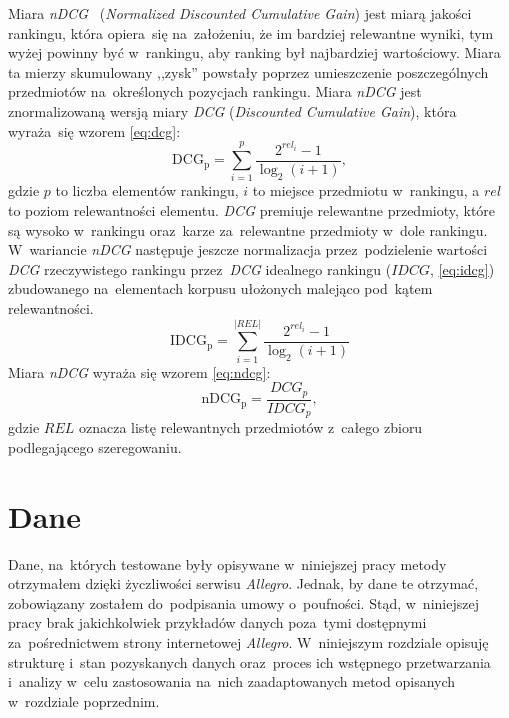\documentclass[pl]{minipw} %
\begin{document}
Miara \textit{nDCG}~\cite{ndcg} (\textit{Normalized Discounted Cumulative Gain}) jest miarą jakości rankingu, która opiera~się na~założeniu, że im bardziej relewantne wyniki, tym wyżej powinny być w~rankingu, aby ranking był najbardziej wartościowy. Miara ta mierzy skumulowany ,,zysk'' powstały poprzez umieszczenie poszczególnych przedmiotów na~określonych pozycjach rankingu. Miara \textit{nDCG} jest znormalizowaną wersją miary \textit{DCG} (\textit{Discounted Cumulative Gain}), która wyraża~się wzorem \ref{eq:dcg}: 
\begin{equation}
\label{eq:dcg}
{\mathrm  {DCG_{{p}}}}=\sum _{{i=1}}^{{p}}{\frac  {2^{{rel_{{i}}}}-1}{\log _{{2}}(i+1)}},
\end{equation}
gdzie $p$ to liczba elementów rankingu, $i$ to miejsce przedmiotu w~rankingu, a $rel$ to poziom relewantności elementu. \textit{DCG} premiuje relewantne przedmioty, które są wysoko w~rankingu oraz~karze za~relewantne przedmioty w~dole rankingu. W~wariancie \textit{nDCG} następuje jeszcze normalizacja przez~podzielenie wartości \textit{DCG} rzeczywistego rankingu przez~\textit{DCG} idealnego rankingu ($IDCG$, \ref{eq:idcg}) zbudowanego na~elementach korpusu ułożonych malejąco pod~kątem relewantności.
\begin{equation}
\label{eq:idcg}
\mathrm {IDCG_{p}} =\sum _{i=1}^{|REL|}{\frac {2^{rel_{i}}-1}{\log _{2}(i+1)}}
\end{equation}
Miara \textit{nDCG} wyraża się wzorem \ref{eq:ndcg}:
\begin{equation}
\label{eq:ndcg}
{\mathrm  {nDCG_{{p}}}}={\frac  {DCG_{{p}}}{IDCG_{{p}}}},
\end{equation}
gdzie $REL$ oznacza listę relewantnych przedmiotów z~całego zbioru podlegającego szeregowaniu.

\chapter{Dane}

Dane, na~których testowane były opisywane w~niniejszej pracy metody otrzymałem dzięki życzliwości serwisu \textit{Allegro}. Jednak, by dane te otrzymać, zobowiązany zostałem do~podpisania umowy o~poufności. Stąd, w~niniejszej pracy brak jakichkolwiek przykładów danych poza~tymi dostępnymi za~pośrednictwem strony internetowej \textit{Allegro}. W~niniejszym rozdziale opisuję strukturę i~stan pozyskanych danych oraz~proces ich wstępnego przetwarzania i~analizy w~celu zastosowania na~nich zaadaptowanych metod opisanych w~rozdziale poprzednim. 
\end{document}
